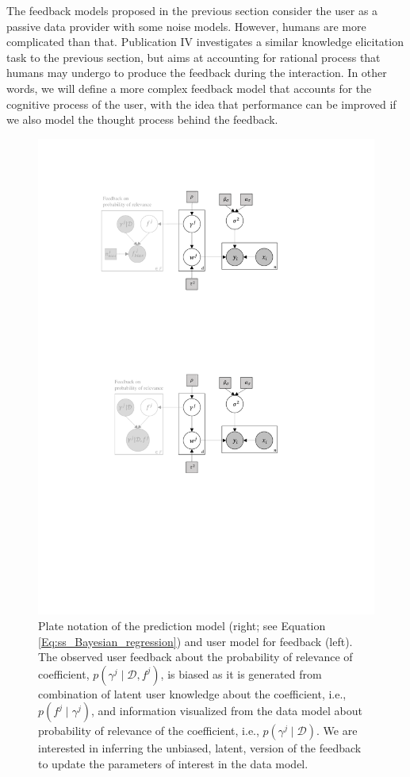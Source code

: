 \documentclass[dissertation,math,vertlayout,pdfa,colorlinks]{aaltoseries}
\newcommand{\bD}{\mathcal{D}}
\begin{document}
The feedback models proposed in the previous section consider the user as a passive data provider with some noise models. However, humans are more complicated than that. Publication IV investigates a similar knowledge elicitation task to the previous section, but aims at accounting for rational process that humans may undergo to produce the feedback during the interaction. In other words, we will define a more complex feedback model that accounts for the cognitive process of the user, with the idea that performance can be improved if we also model the thought process behind the feedback.

\begin{figure}
	\centering
	\includegraphics[width=0.80\linewidth]{Figures/Plate_diagram_OF.pdf}
	\caption{Plate notation of the prediction model (right; see Equation \ref{Eq:ss_Bayesian_regression}) and user model for feedback (left). The observed user feedback about the probability of relevance of coefficient, $p(\gamma^j \mid \bD,f^j)$, is biased as it is generated from combination of latent user knowledge about the coefficient, i.e., $p(f^j \mid \gamma^j)$, and information visualized from the data model about probability of relevance of the coefficient, i.e., $p(\gamma^j\mid \bD)$. We are interested in inferring the unbiased, latent, version of the feedback to update the parameters of interest in the data model.}
	\label{fig:Plate_OF}
\end{figure}
\end{document}
